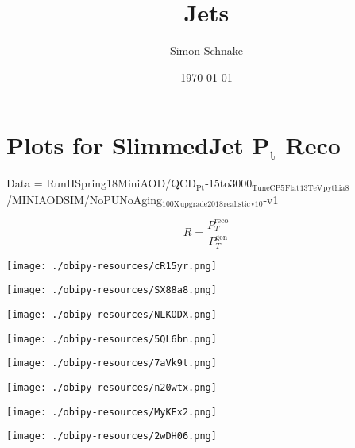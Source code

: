 \documentclass[11pt]{article}
\author{Simon Schnake}
\date{\today}
\title{Jets}
\begin{document}
\maketitle

\section{Plots for SlimmedJet P\(_{\text{t}}\) Reco}
\label{sec:orgd5b4d40}

Data = RunIISpring18MiniAOD/QCD\(_{\text{Pt}}\)-15to3000\(_{\text{TuneCP5}}\)\(_{\text{Flat}}\)\(_{\text{13TeV}}\)\(_{\text{pythia8}}\)/MINIAODSIM/NoPUNoAging\(_{\text{100X}}\)\(_{\text{upgrade2018}}\)\(_{\text{realistic}}\)\(_{\text{v10}}\)-v1

\[ R = \frac{P_{T}^{{\text{reco}}}}{P_{T}^{{\text{gen}}}}\]


\begin{center}
\texttt{[image: ./obipy-resources/cR15yr.png]}
\end{center}


\begin{center}
\texttt{[image: ./obipy-resources/SX88a8.png]}
\end{center}

\begin{center}
\texttt{[image: ./obipy-resources/NLKODX.png]}
\end{center}



\begin{center}
\texttt{[image: ./obipy-resources/5QL6bn.png]}
\end{center}

\begin{center}
\texttt{[image: ./obipy-resources/7aVk9t.png]}
\end{center}


\begin{center}
\texttt{[image: ./obipy-resources/n20wtx.png]}
\end{center}


\begin{center}
\texttt{[image: ./obipy-resources/MyKEx2.png]}
\end{center}


\begin{center}
\texttt{[image: ./obipy-resources/2wDH06.png]}
\end{center}
\end{document}
